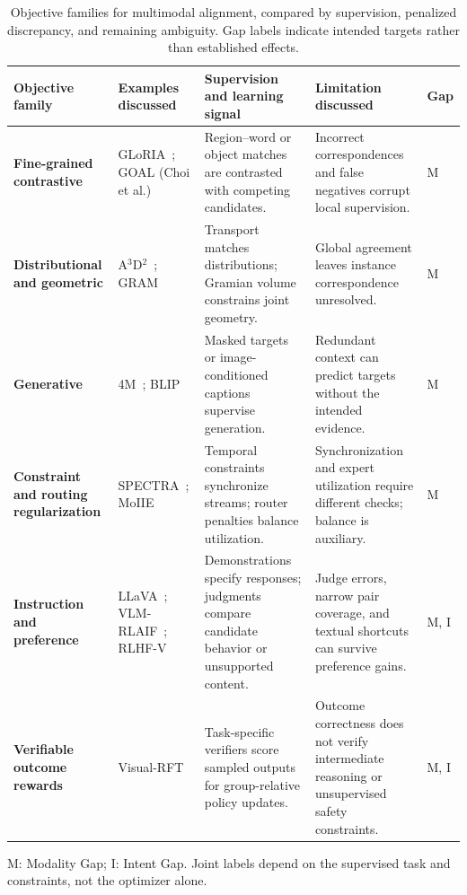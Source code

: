 \begin{table}[t]
\centering
\caption{Objective families for multimodal alignment, compared by supervision, penalized discrepancy, and remaining ambiguity. Gap labels indicate intended targets rather than established effects.}
\label{tab:objective-comparison}
\footnotesize
\setlength{\tabcolsep}{4pt}
\renewcommand{\arraystretch}{1.18}
\begin{tabularx}{\textwidth}{>{\raggedright\arraybackslash}p{}>{\raggedright\arraybackslash}p{}>{\raggedright\arraybackslash}X>{\raggedright\arraybackslash}X>{\centering\arraybackslash}p{}}
\toprule
\rowcolor{surveyheader}
\textbf{Objective family} & \textbf{Examples discussed} & \textbf{Supervision and learning signal} & \textbf{Limitation discussed} & \textbf{Gap} \\
\midrule
\textbf{Fine-grained contrastive} & GLoRIA~\cite{gloria}; GOAL (Choi et al.)~\cite{choi2025goal} & Region--word or object matches are contrasted with competing candidates. & Incorrect correspondences and false negatives corrupt local supervision. & M \\
\textbf{Distributional and geometric} & A$^3$D$^2$~\cite{sun2025a3d2}; GRAM~\cite{cicchetti2024gram} & Transport matches distributions; Gramian volume constrains joint geometry. & Global agreement leaves instance correspondence unresolved. & M \\
\textbf{Generative} & 4M~\cite{mizrahi20234m}; BLIP~\cite{li2022blip} & Masked targets or image-conditioned captions supervise generation. & Redundant context can predict targets without the intended evidence. & M \\
\textbf{Constraint and routing regularization} & SPECTRA~\cite{Yu2023SpeechTextPF}; MoIIE~\cite{wang2025moiie} & Temporal constraints synchronize streams; router penalties balance utilization. & Synchronization and expert utilization require different checks; balance is auxiliary. & M \\
\textbf{Instruction and preference} & LLaVA~\cite{liu2023llava}; VLM-RLAIF~\cite{ahn2024rlaif_v}; RLHF-V~\cite{yu2024rlhf} & Demonstrations specify responses; judgments compare candidate behavior or unsupported content. & Judge errors, narrow pair coverage, and textual shortcuts can survive preference gains. & M, I \\
\textbf{Verifiable outcome rewards} & Visual-RFT~\cite{liu2025visualrft} & Task-specific verifiers score sampled outputs for group-relative policy updates. & Outcome correctness does not verify intermediate reasoning or unsupervised safety constraints. & M, I \\
\bottomrule
\end{tabularx}
\par\smallskip\raggedright\footnotesize M: Modality Gap; I: Intent Gap. Joint labels depend on the supervised task and constraints, not the optimizer alone.
\end{table}
